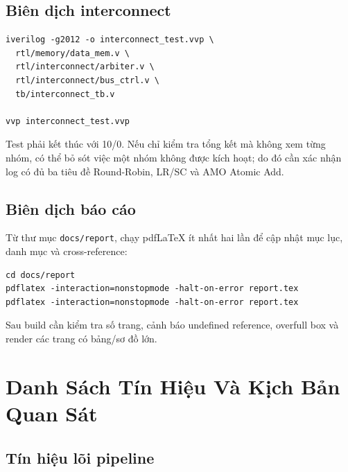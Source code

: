 \section{Biên dịch interconnect}

\begin{lstlisting}[language={},numbers=none,caption={Build và chạy \texttt{interconnect\_tb}},label={lst:build_interconnect_full}]
iverilog -g2012 -o interconnect_test.vvp \
  rtl/memory/data_mem.v \
  rtl/interconnect/arbiter.v \
  rtl/interconnect/bus_ctrl.v \
  tb/interconnect_tb.v

vvp interconnect_test.vvp
\end{lstlisting}

Test phải kết thúc với 10/0. Nếu chỉ kiểm tra tổng kết mà không xem từng nhóm, có thể bỏ sót việc một nhóm không được kích hoạt; do đó cần xác nhận log có đủ ba tiêu đề Round-Robin, LR/SC và AMO Atomic Add.

\section{Biên dịch báo cáo}

Từ thư mục \texttt{docs/report}, chạy pdfLaTeX ít nhất hai lần để cập nhật mục lục, danh mục và cross-reference:

\begin{lstlisting}[language={},numbers=none,caption={Biên dịch báo cáo},label={lst:build_report}]
cd docs/report
pdflatex -interaction=nonstopmode -halt-on-error report.tex
pdflatex -interaction=nonstopmode -halt-on-error report.tex
\end{lstlisting}

Sau build cần kiểm tra số trang, cảnh báo undefined reference, overfull box và render các trang có bảng/sơ đồ lớn.

\chapter{Danh Sách Tín Hiệu Và Kịch Bản Quan Sát}
\label{app:signals}

\section{Tín hiệu lõi pipeline}

